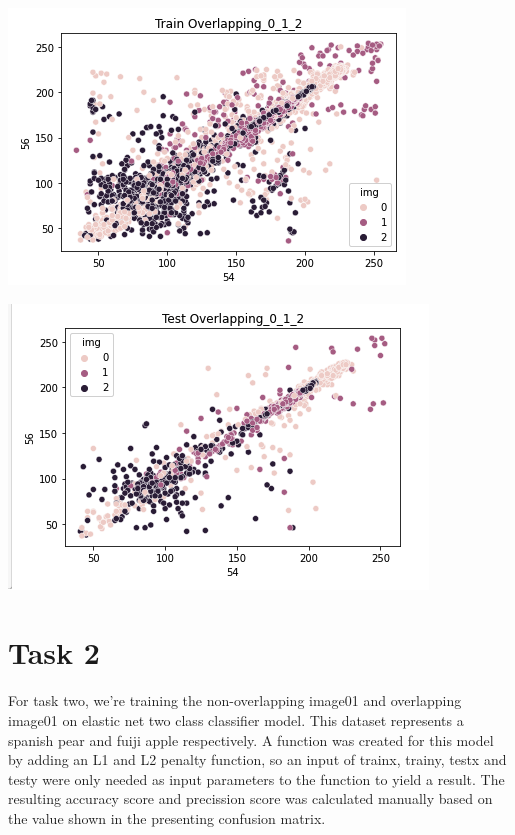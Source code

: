\documentclass[12pt]{article}
\begin{document}
\begin{multicols*}{2}
\begin{center}
		\includegraphics[scale=0.3]{../screenshot/train_scatter_012.png}

		\includegraphics[scale=0.3]{../screenshot/test_scatter_012.png}
	\end{center}

  \section{Task 2}
  \hspace*{10mm}For task two, we're training the non-overlapping image01 and overlapping image01 on
  elastic net two class classifier model. This dataset represents a spanish pear and fuiji apple respectively.
  A function was created for this model by adding an L1 and L2 penalty function, so an input
  of trainx, trainy, testx and testy were only needed as input parameters to the function to
  yield a result. The resulting accuracy score and precission score was calculated manually based on the value shown
  in the presenting confusion matrix. 


\end{multicols*}
\end{document}
